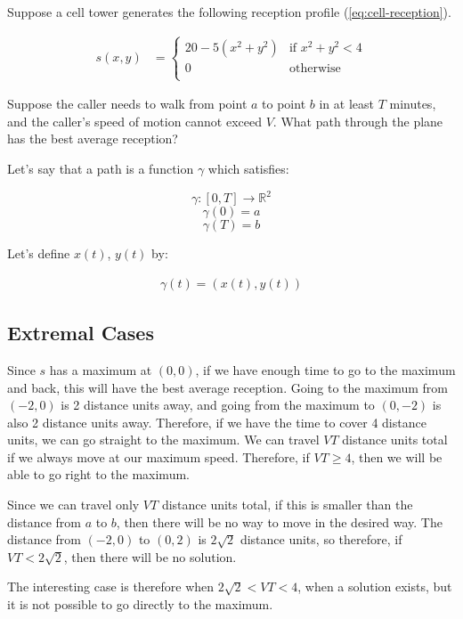 \documentclass{article}
\begin{document}
Suppose a cell tower generates the following reception profile 
	(\ref{eq:cell-reception}).

\begin{align}
s(x,y) & = \begin{cases}
	20 - 5 (x^2 + y^2) & \text{if $x^2 + y^2 < 4$} \\ 
	0 & \text{otherwise} \\ \end{cases} \label{eq:cell-reception}
\end{align}

Suppose the caller needs to walk from point $a$ to point $b$ in at least $T$ minutes, 
	and the caller's speed of motion cannot exceed $V$.
What path through the plane has the best average reception?

Let's say that a path is a function $\gamma$ which satisfies:

\[ \gamma : [0,T] \to \mathbb{R}^2 \]
\[ \gamma(0) = a \]
\[ \gamma(T) = b \]

Let's define $x(t)$, $y(t)$ by:

\begin{align}
\gamma(t) = (x(t), y(t))
\end{align}

\subsection{Extremal Cases}

Since $s$ has a maximum at $(0,0)$, if we have enough time to go to the maximum
	and back, this will have the best average reception.
Going to the maximum from $(-2,0)$ is 2 distance units away, and going from
	the maximum to $(0,-2)$ is also 2 distance units away.
Therefore, if we have the time to cover 4 distance units, we can go straight to the
	maximum.
We can travel $V T$ distance units total if we always move at our maximum speed.
Therefore, if $V T \geq 4$, then we will be able to go right to the maximum.

Since we can travel only $ V T$ distance units total, if this is smaller than 
	the distance from $a$ to $b$, then there will be no way to move in the 
	desired way.
The distance from $(-2,0)$ to $(0,2)$ is $2 \sqrt{2}$ distance units, so therefore,
	if $V T < 2 \sqrt{2}$, then there will be no solution.

The interesting case is therefore when $2 \sqrt{2} < V T < 4$, when a solution
	exists, but it is not possible to go directly to the maximum.
\end{document}
